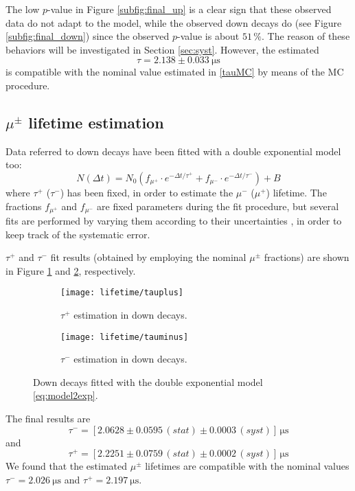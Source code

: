The low $p$-value in Figure \ref{subfig:final_up} is a clear sign that these observed data do not adapt to the model, while the observed down decays do (see Figure \ref{subfig:final_down}) since the observed $p$-value is about $51\,\%$. The reason of these behaviors will be investigated in Section \ref{sec:syst}. However, the estimated 
\begin{equation}
\tau=2.138\pm\SI{0.033}{\micro\second}
\end{equation}
is compatible with the nominal value estimated in \ref{tauMC} by means of the MC procedure.

\subsection{$\mu^\pm$ lifetime estimation}
Data referred to down decays have been fitted with a double exponential model too:
\begin{equation}\label{eq:model2exp}
N\left(\Delta t\right) = N_0\left(f_{\mu^+}\cdot e^{-\Delta t/\tau^+} + f_{\mu^-}\cdot e^{-\Delta t/\tau^-}\right)+B
\end{equation}
where $\tau^+$ ($\tau^-$) has been fixed, in order to estimate the $\mu^-$ ($\mu^+$) lifetime. The fractions $f_{\mu^+}$ and $f_{\mu^-}$ are fixed parameters during the fit procedure, but several fits are performed by varying them according to their uncertainties \cite{charge}, in order to keep track of the systematic error.

$\tau^+$ and $\tau^-$ fit results (obtained by employing the nominal $\mu^\pm$ fractions) are shown in Figure \ref{subfig:taup} and \ref{subfig:taum}, respectively.\\
\begin{figure}[!htp]
	\centering
	\begin{subfigure}{.5\linewidth}
	\centering
	\texttt{[image: lifetime/tauplus]}
	\caption{$\tau^+$ estimation in down decays.}\label{subfig:taup}
\end{subfigure}\hfill
\begin{subfigure}{.5\linewidth}
	\centering
	\texttt{[image: lifetime/tauminus]}
	\caption{$\tau^-$ estimation in down decays.}\label{subfig:taum}
\end{subfigure}
\caption{Down decays fitted with the double exponential model \eqref{eq:model2exp}.}\label{fig:taupm}
\end{figure}

\noindent The final results are
\begin{equation}
\tau^- = \left[2.0628 \pm 0.0595\,(stat) \pm 0.0003\,(syst)\right]\,\si{\micro\second} 
\end{equation}
and
\begin{equation}
\tau^+ = \left[2.2251 \pm 0.0759\,(stat) \pm 0.0002\,(syst)\right]\,\si{\micro\second} 
\end{equation}
We found that the estimated $\mu^\pm$ lifetimes are compatible with the nominal values $\tau^- = \SI{2.026}{\micro\second}$ and $\tau^+ = \SI{2.197}{\micro\second}$.


